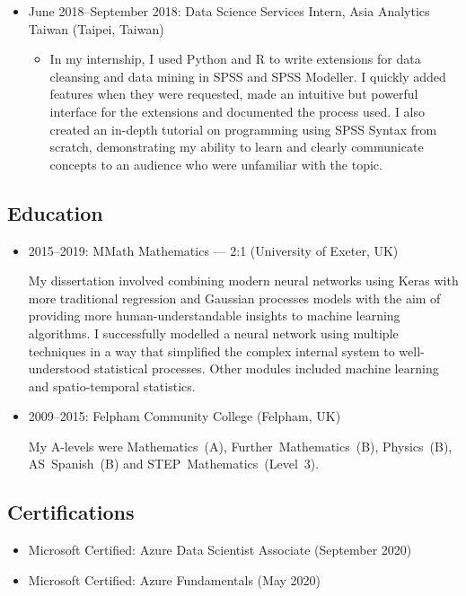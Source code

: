 \documentclass[11pt, a4paper]{article}
\begin{document}
\begin{itemize}
	\item June 2018--September 2018: Data Science Services Intern, Asia Analytics Taiwan (Taipei, Taiwan)
	\begin{itemize}
		\item In my internship, I used Python and R to write extensions for data cleansing and data mining in SPSS and SPSS Modeller.
		I quickly added features when they were requested, made an intuitive but powerful interface for the extensions and documented the process used.
		I also created an in-depth tutorial on programming using SPSS Syntax from scratch, demonstrating my ability to learn and clearly communicate concepts to an audience who were unfamiliar with the topic.
	\end{itemize}
\end{itemize}

\subsection*{Education}

\begin{itemize} 
	\item 2015--2019: MMath Mathematics --- 2:1 (University of Exeter, UK)

	My dissertation involved combining modern neural networks using Keras with more traditional regression and Gaussian processes models with the aim of providing more human-understandable insights to machine learning algorithms.
	I successfully modelled a neural network using multiple techniques in a way that simplified the complex internal system to well-understood statistical processes.
	Other modules included machine learning and spatio-temporal statistics.

	\item 2009--2015: Felpham Community College (Felpham, UK)

	My A-levels were Mathematics~(A), Further~Mathematics~(B), Physics~(B), AS~Spanish~(B) and STEP~Mathematics~(Level~3).
\end{itemize}

\subsection*{Certifications}

\begin{itemize}
\item Microsoft Certified: Azure Data Scientist Associate (September 2020)

\item Microsoft Certified: Azure Fundamentals (May 2020)
\end{itemize}
\end{document}

